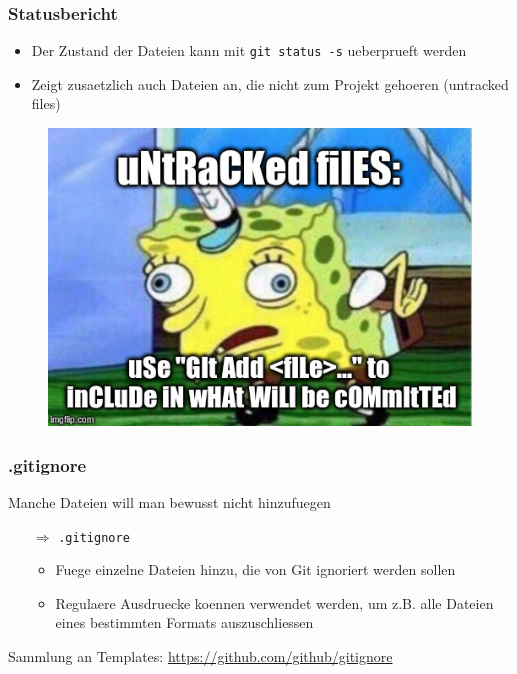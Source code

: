 \documentclass[12pt,utf8]{beamer}
\begin{document}
	\begin{frame}
	\frametitle{Statusbericht}
		\begin{itemize}
			\item Der Zustand der Dateien kann mit \texttt{git status -s} ueberprueft werden\\
			\item Zeigt zusaetzlich auch Dateien an, die nicht zum Projekt gehoeren (untracked files)
		\end{itemize}
	\end{frame}

	\begin{frame}
		\begin{figure}
			\includegraphics[scale=0.6]{resources/sponge.jpg}
			
			\tiny{\cite{sponge}}
		\end{figure}
	\end{frame}
	
	\begin{frame}
		\frametitle{.gitignore}
		Manche Dateien will man bewusst nicht hinzufuegen
		\begin{itemize}
			\item[$\Rightarrow$] \texttt{.gitignore}
			\begin{itemize}
				\item Fuege einzelne Dateien hinzu, die von Git ignoriert werden sollen
				\item Regulaere Ausdruecke koennen verwendet werden, um z.B. alle Dateien eines bestimmten Formats auszuschliessen
			\end{itemize}
		\end{itemize}
		Sammlung an Templates: \url{https://github.com/github/gitignore}
	\end{frame}
\end{document}
